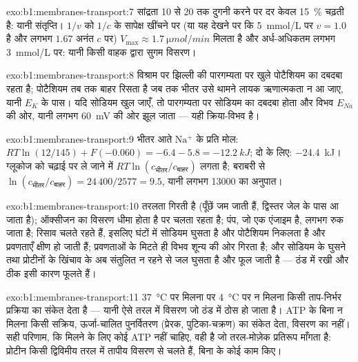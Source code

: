 \begin{solution}{exo:b1:membranes-transport:7}
सांद्रता 10 से 20 तक दुगनी करने पर दर केवल \qty{15}{\%} चढ़ती है:
यानी संतृप्ति। $1/v$ को $1/c$ के सापेक्ष खींचने पर (या यह देखने पर कि
\qty{5}{mmol/L} पर $v = 1.0$ है और लगभग $1.67$ अनंत $c$ पर)
$V_{\max} \approx \qty{1.7}{\micro mol/min}$ मिलता है और अर्ध-अधिकतम लगभग
\qty{3}{mmol/L} पर: यानी किसी वाहक द्वारा सुगम विसरण।
\end{solution}

\begin{solution}{exo:b1:membranes-transport:8}
विश्राम पर झिल्ली की पारगम्यता पर खुले पोटैशियम  का दबदबा रहता है;
पोटैशियम तब तक बाहर रिसता है जब तक भीतर उसे थामने लायक ऋणात्मकता न आ
जाए, यानी $E_K$ के पास। यदि सोडियम  खुल जाएँ, तो पारगम्यता पर
सोडियम का दबदबा होता और विभव $E_{Na}$ की ओर, यानी लगभग \qty{+60}{mV} की
ओर झूल जाता --- यही क्रिया-विभव है।
\end{solution}

\begin{solution}{exo:b1:membranes-transport:9}
भीतर आते $\mathrm{Na^+}$ के प्रति मोल: $RT\ln(12/145) + F(-0.060) = -6.4 - 5.8
= \qty{-12.2}{kJ}$; दो के लिए: \qty{-24.4}{kJ}। ग्लूकोज को चढ़ाई पर ले
जाने में $RT\ln(c_{\text{भीतर}}/c_{\text{बाहर}})$ लगता है; बराबरी से
$\ln(c_{\text{भीतर}}/c_{\text{बाहर}}) = 24\,400/2577 = 9.5$, यानी लगभग
\num{13000} का अनुपात।
\end{solution}

\begin{solution}{exo:b1:membranes-transport:10}
तरलता गिरती है (पूँछें जम जाती हैं, द्विस्तर जेल के पास आ जाता है);
ऑक्सीजन का विसरण धीमा होता है पर चलता रहता है; पंप, जो एक एंजाइम है,
लगभग रुक जाता है; रिसाव चलते रहते हैं, इसलिए घंटों में सोडियम घुसता है और
पोटैशियम निकलता है और प्रवणताएँ क्षीण हो जाती हैं; प्रवणताओं के मिटते ही
विभव शून्य की ओर गिरता है; और सोडियम के घुसने तथा प्रोटीनों के 
खिंचाव के अब संतुलित न रहने से जल घुसता है और  फूल जाती है ---
ठंड में रखी  और  ठीक इसी कारण फूलते हैं।
\end{solution}

\begin{solution}{exo:b1:membranes-transport:11}
\qty{37}{\celsius} पर मिलना पर \qty{4}{\celsius} पर न मिलना किसी
ताप-निर्भर प्रक्रिया का संकेत देता है --- यानी ऐसे तरल में विसरण जो ठंड
में ठोस हो जाता है। ATP के बिना न मिलना किसी सक्रिय, ऊर्जा-चालित पुनर्वितरण
(प्रेरक, पुटिका-चक्रण) का संकेत देता, विसरण का नहीं। सही परिणाम, कि
मिलने के लिए कोई ATP नहीं चाहिए, वही है जो तरल-मोज़ेक प्रतिरूप माँगता है:
प्रोटीन किसी द्विविमीय तरल में तापीय विसरण से चलते हैं, बिना  के
कोई काम किए।
\end{solution}

